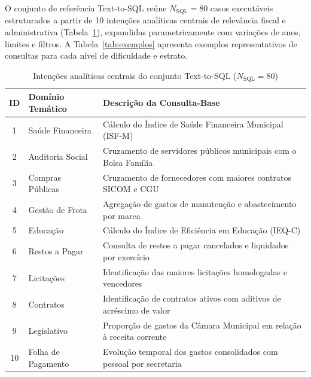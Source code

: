 \documentclass[12pt]{article}
\begin{document}
O conjunto de referência Text-to-SQL reúne $N_{\text{SQL}} = 80$ casos executáveis estruturados a partir de 10 intenções analíticas centrais de relevância fiscal e administrativa (Tabela~\ref{tab:intencoes}), expandidas parametricamente com variações de anos, limites e filtros. A Tabela~\ref{tab:exemplos} apresenta exemplos representativos de consultas para cada nível de dificuldade e estrato.

\begin{table}[htbp]
\centering
\caption{Intenções analíticas centrais do conjunto Text-to-SQL ($N_{\text{SQL}} = 80$)}
\label{tab:intencoes}
\small
\begin{tabular}{clp{9cm}}
\toprule
\textbf{ID} & \textbf{Domínio Temático} & \textbf{Descrição da Consulta-Base} \\
\midrule
1 & Saúde Financeira & Cálculo do Índice de Saúde Financeira Municipal (ISF-M) \\
2 & Auditoria Social & Cruzamento de servidores públicos municipais com o Bolsa Família \\
3 & Compras Públicas & Cruzamento de fornecedores com maiores contratos SICOM e CGU \\
4 & Gestão de Frota & Agregação de gastos de manutenção e abastecimento por marca \\
5 & Educação & Cálculo do Índice de Eficiência em Educação (IEQ-C) \\
6 & Restos a Pagar & Consulta de restos a pagar cancelados e liquidados por exercício \\
7 & Licitações & Identificação das maiores licitações homologadas e vencedores \\
8 & Contratos & Identificação de contratos ativos com aditivos de acréscimo de valor \\
9 & Legislativo & Proporção de gastos da Câmara Municipal em relação à receita corrente \\
10 & Folha de Pagamento & Evolução temporal dos gastos consolidados com pessoal por secretaria \\
\bottomrule
\end{tabular}
\end{table}
\end{document}
